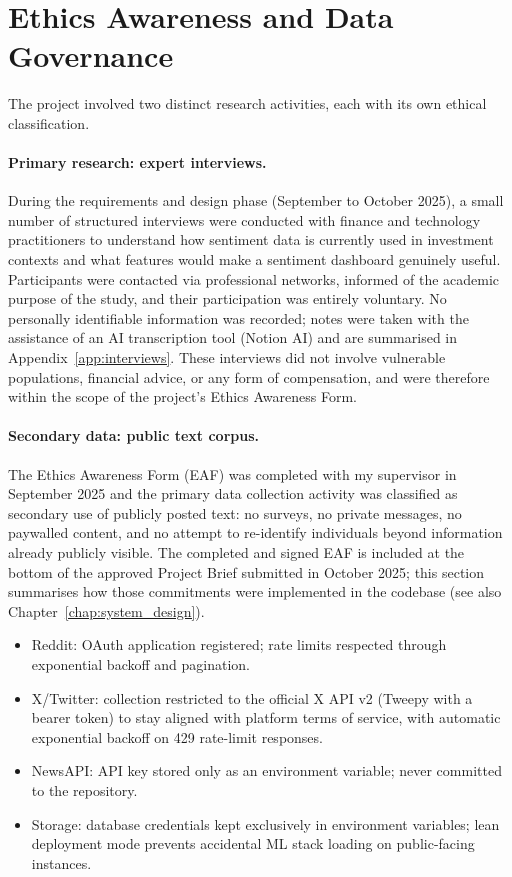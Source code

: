 \section{Ethics Awareness and Data Governance}
\label{app:ethics}

The project involved two distinct research activities, each with its own ethical classification.

\paragraph{Primary research: expert interviews.}
During the requirements and design phase (September to October 2025), a small number of structured interviews were conducted with finance and technology practitioners to understand how sentiment data is currently used in investment contexts and what features would make a sentiment dashboard genuinely useful. Participants were contacted via professional networks, informed of the academic purpose of the study, and their participation was entirely voluntary. No personally identifiable information was recorded; notes were taken with the assistance of an AI transcription tool (Notion AI) and are summarised in Appendix~\ref{app:interviews}. These interviews did not involve vulnerable populations, financial advice, or any form of compensation, and were therefore within the scope of the project's Ethics Awareness Form.

\paragraph{Secondary data: public text corpus.}
The Ethics Awareness Form (EAF) was completed with my supervisor in September 2025 and the primary data collection activity was classified as secondary use of publicly posted text: no surveys, no private messages, no paywalled content, and no attempt to re-identify individuals beyond information already publicly visible. The completed and signed EAF is included at the bottom of the approved Project Brief submitted in October 2025; this section summarises how those commitments were implemented in the codebase (see also Chapter~\ref{chap:system_design}).

\begin{itemize}
  \item Reddit: OAuth application registered; rate limits respected through exponential backoff and pagination.
  \item X/Twitter: collection restricted to the official X API v2 (Tweepy with a bearer token) to stay aligned with platform terms of service, with automatic exponential backoff on 429 rate-limit responses.
  \item NewsAPI: API key stored only as an environment variable; never committed to the repository.
  \item Storage: database credentials kept exclusively in environment variables; lean deployment mode prevents accidental ML stack loading on public-facing instances.
\end{itemize}

